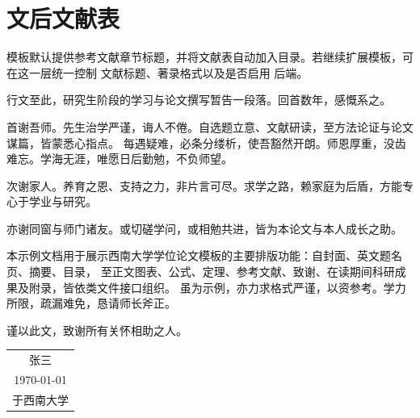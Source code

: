 \section{文后文献表}
模板默认提供参考文献章节标题，并将文献表自动加入目录。若继续扩展模板，可在这一层统一控制
文献标题、著录格式以及是否启用  后端。

\backmatter
\printbibliography[heading=bibintoc,title={参考文献}]

\begin{ack}
行文至此，研究生阶段的学习与论文撰写暂告一段落。回首数年，感慨系之。

首谢吾师。先生治学严谨，诲人不倦。自选题立意、文献研读，至方法论证与论文谋篇，皆蒙悉心指点。
每遇疑难，必条分缕析，使吾豁然开朗。师恩厚重，没齿难忘。学海无涯，唯愿日后勤勉，不负师望。

次谢家人。养育之恩、支持之力，非片言可尽。求学之路，赖家庭为后盾，方能专心于学业与研究。

亦谢同窗与师门诸友。或切磋学问，或相勉共进，皆为本论文与本人成长之助。

本示例文档用于展示西南大学\swuThesisTierZh 学位论文模板的主要排版功能：自封面、英文题名页、摘要、目录，
至正文图表、公式、定理、参考文献、致谢、在读期间科研成果及附录，皆依类文件接口组织。
虽为示例，亦力求格式严谨，以资参考。学力所限，疏漏难免，恳请师长斧正。

谨以此文，致谢所有关怀相助之人。

\vspace{\baselineskip}
\begin{flushright}
\begin{tabular}{c}
张三\\
\today\\
于西南大学
\end{tabular}
\end{flushright}
\end{ack}


